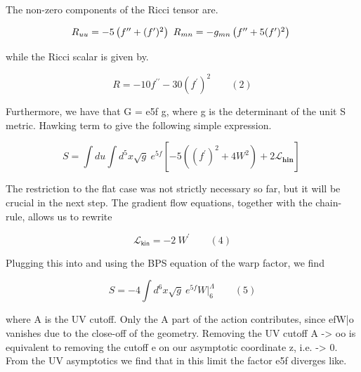 \documentclass{article}
\begin{document}
\sloppy

The non-zero components of the Ricci tensor are.


\begin{equation}
\begin{array} { c c c } { R _ { u u } = - 5 \left ( f ^ { \prime \prime } + ( f ^ { \prime } ) ^ { 2 } \right ) ~ R _ { m n } = - g _ { m n } \left ( f ^ { \prime \prime } + 5 ( f ^ { \prime } ) ^ { 2 } \right ) ~ }\end{array}
\end{equation}


while the Ricci scalar is given by.


\begin{equation}
R = - 1 0 f ^ { \prime \prime } - 3 0 ( f ^ { \prime } ) ^ { 2 } \qquad ( 2 )
\end{equation}


Furthermore, we have that G = e5f g, where g is the determinant of the unit S metric.
Hawking term to give the following simple expression.


\begin{equation}
S = \int d u \int d ^ { 5 } x \sqrt { g } ~ e ^ { 5 f } \left [ - 5 \left ( ( f ^ { \prime } ) ^ { 2 } + 4 W ^ { 2 } \right ) + 2 \mathcal { L } _ \mathbf { h i n } \right ] ~
\end{equation}


The restriction to the flat case was not strictly necessary so far, but it will be crucial in the
next step. The gradient flow equations, together with the chain-rule, allows us to rewrite


\begin{equation}
\mathcal { L } _ \mathsf { k i n } = - 2 ~ W ^ { \prime } \qquad ( 4 )
\end{equation}


Plugging this into and using the BPS equation of the warp factor, we find


\begin{equation}
S = - 4 \int d ^ { 6 } \! x \sqrt { g } ~ e ^ { 5 f } W \Big | _ { 6 } ^ { \Lambda } \qquad ( 5 )
\end{equation}


where A is the UV cutoff. Only the A part of the action contributes, since efW|o vanishes
due to the close-off of the geometry. Removing the UV cutoff A -> oo is equivalent to
removing the cutoff e on our asymptotic coordinate z, i.e.  -> 0. From the UV asymptotics
we find that in this limit the factor e5f diverges like.
\end{document}
